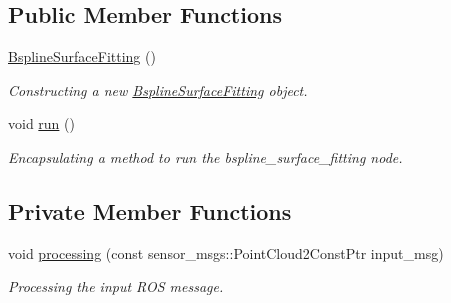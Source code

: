 \subsection*{Public Member Functions}
\begin{DoxyCompactItemize}
\item 
\hyperlink{classbspline__surface__fitting__node_1_1_bspline_surface_fitting_a0c6104db4570cd4a865e85d03fae26c3}{Bspline\+Surface\+Fitting} ()
\begin{DoxyCompactList}\small\item\em Constructing a new \hyperlink{classbspline__surface__fitting__node_1_1_bspline_surface_fitting}{Bspline\+Surface\+Fitting} object. \end{DoxyCompactList}\item 
void \hyperlink{classbspline__surface__fitting__node_1_1_bspline_surface_fitting_a3ca4a5eb83d40636830e337cac288d03}{run} ()
\begin{DoxyCompactList}\small\item\em Encapsulating a method to run the bspline\+\_\+surface\+\_\+fitting node. \end{DoxyCompactList}\end{DoxyCompactItemize}
\subsection*{Private Member Functions}
\begin{DoxyCompactItemize}
\item 
void \hyperlink{classbspline__surface__fitting__node_1_1_bspline_surface_fitting_a588e2e4f382fc5198b4c17613cf7f03a}{processing} (const sensor\+\_\+msgs\+::\+Point\+Cloud2\+Const\+Ptr input\+\_\+msg)
\begin{DoxyCompactList}\small\item\em Processing the input R\+OS message. \end{DoxyCompactList}\end{DoxyCompactItemize}
